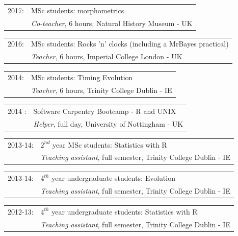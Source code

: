 \documentclass[10pt,a4paper]{article}
\begin{document}
{%
\begin{tabular}{ll}
2017: & MSc students: morphometrics\\
      & \textit{Co-teacher}, 6 hours, Natural History Museum - UK \\
\end{tabular}

\begin{tabular}{ll}
2016: & MSc students: Rocks 'n' clocks (including a MrBayes practical)\\
      & \textit{Teacher}, 6 hours, Imperial College London - UK \\
\end{tabular}

\begin{tabular}{ll}
2014: & MSc students: Timing Evolution \\
      & \textit{Teacher}, 6 hours, Trinity College Dublin - IE \\
\end{tabular}

\begin{tabular}{ll}
2014 : & Software Carpentry Bootcamp - R and UNIX \\
      & \textit{Helper}, full day, University of Nottingham - UK \\
\end{tabular}

\begin{tabular}{ll}
2013-14: & $2^{nd}$ year MSc students: Statistics with R \\
         & \textit{Teaching assistant}, full semester, Trinity College Dublin - IE \\
\end{tabular}

\begin{tabular}{ll}
2013-14: & $4^{th}$ year undergraduate students: Evolution\\
         & \textit{Teaching assistant}, full semester, Trinity College Dublin - IE\\
\end{tabular}

\begin{tabular}{ll}
2012-13: & $4^{th}$ year undergraduate students: Statistics with R\\
         & \textit{Teaching assistant}, full semester, Trinity College Dublin - IE\\
\end{tabular}

}
\end{document}
